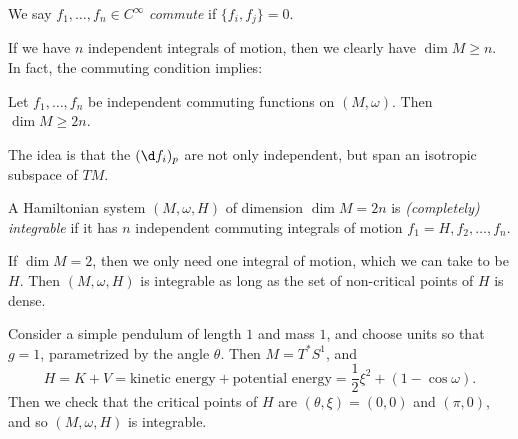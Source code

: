 \documentclass[a4paper]{article}
\begin{document}
\begin{defi}
  We say $f_1, \ldots, f_n \in C^\infty$ \emph{commute} if $\{f_i, f_j\} = 0$.
\end{defi}

If we have $n$ independent integrals of motion, then we clearly have $\dim M \geq n$. In fact, the commuting condition implies:
\begin{ex}
  Let $f_1, \ldots, f_n$ be independent commuting functions on $(M, \omega)$. Then $\dim M \geq 2n$.
\end{ex}
The idea is that the $(\d f_i)_p$ are not only independent, but span an isotropic subspace of $TM$.

\begin{defi}
  A Hamiltonian system $(M, \omega, H)$ of dimension $\dim M = 2n$ is \emph{(completely) integrable} if it has $n$ independent commuting integrals of motion $f_1 = H, f_2, \ldots, f_n$.
\end{defi}

\begin{eg}
  If $\dim M = 2$, then we only need one integral of motion, which we can take to be $H$. Then $(M, \omega, H)$ is integrable as long as the set of non-critical points of $H$ is dense.
\end{eg}

\begin{eg}
  Consider a simple pendulum of length $1$ and mass $1$, and choose units so that $g = 1$, parametrized by the angle $\theta$. Then $M = T^* S^1$, and
  \[
    H = K + V = \text{kinetic energy} + \text{potential energy} = \frac{1}{2}\xi^2 + (1 - \cos \omega).
  \]
  Then we check that the critical points of $H$ are $(\theta, \xi) = (0, 0)$ and $(\pi, 0)$, and so $(M, \omega, H)$ is integrable.
\end{eg}
\end{document}
